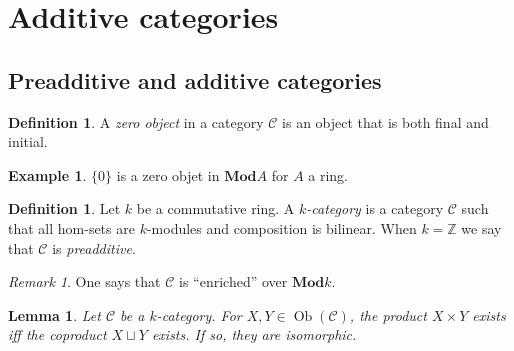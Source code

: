 \documentclass{article}
\newcommand{\Z}{\mathbb{Z}}
\newcommand{\cat}{\mathcal{C}}
\newcommand{\Mod}{\mathbf{Mod}}
\DeclareMathOperator{\Ob}{Ob}
\theoremstyle{plain}
\newtheorem{lemma}[theorem]{Lemma}
\theoremstyle{definition}
\newtheorem{definition}[theorem]{Definition}
\newtheorem{example}[theorem]{Example}
\theoremstyle{remark}
\newtheorem*{remark}{Remark}
\begin{document}
\section{Additive categories}
\subsection{Preadditive and additive categories}

\begin{definition}
    A \emph{zero object} in a category $\cat$ is an object that is both final and initial.
\end{definition}

\begin{example}
    $\{0\}$ is a zero objet in $\Mod A$ for $A$ a ring.
\end{example}

\begin{definition}
    Let $k$ be a commutative ring. A \emph{$k$-category} is a category $\cat$ such that all hom-sets are $k$-modules and composition is bilinear. When $k = \Z$ we say that $\cat$ is \emph{preadditive}.
\end{definition}

\begin{remark}
    One says that $\cat$ is ``enriched'' over $\Mod k$.
\end{remark}

\begin{lemma}
    Let $\cat$ be a $k$-category. For $X,Y \in \Ob(\cat)$, the product $X \times Y$ exists iff the coproduct $X \sqcup Y$ exists. If so, they are isomorphic.
\end{lemma}
\end{document}
